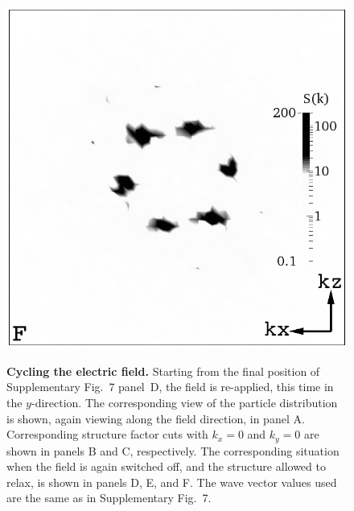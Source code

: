 \documentclass[12pt,twoside]{article}
\begin{document}
\begin{figure}[!h]
\begin{center}
\includegraphics[width=0.32\columnwidth]{sq_y_run1344.png}\\
\end{center}
\caption{\textbf{Cycling the electric field.}
Starting from the final position of
Supplementary Fig.~7 panel~D, the field is re-applied, this time in the
$y$-direction. The corresponding view of the particle distribution is
shown, again viewing along the field direction, in panel A.
Corresponding structure factor cuts with $k_x = 0$ and $k_y = 0$ are
shown in panels B and C, respectively. The corresponding situation when
the field is again switched off, and the structure allowed to relax,
is shown in panels D, E, and F. The wave vector values used are the
same as in Supplementary Fig.~7.}
\end{figure}

\newpage
\end{document}

